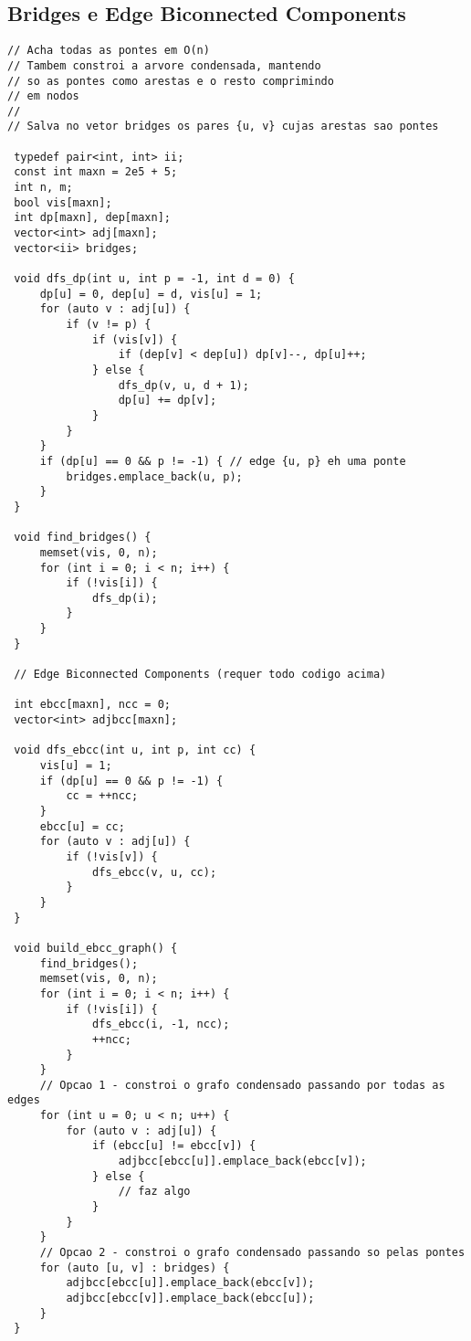 \documentclass[11pt, a4paper, twoside]{article}
\begin{document}
\subsection{Bridges e Edge Biconnected Components}
\begin{lstlisting}
// Acha todas as pontes em O(n)
// Tambem constroi a arvore condensada, mantendo
// so as pontes como arestas e o resto comprimindo
// em nodos
//
// Salva no vetor bridges os pares {u, v} cujas arestas sao pontes

 typedef pair<int, int> ii;
 const int maxn = 2e5 + 5;
 int n, m;
 bool vis[maxn];
 int dp[maxn], dep[maxn];
 vector<int> adj[maxn];
 vector<ii> bridges;
 
 void dfs_dp(int u, int p = -1, int d = 0) {
     dp[u] = 0, dep[u] = d, vis[u] = 1;
     for (auto v : adj[u]) {
         if (v != p) {
             if (vis[v]) {
                 if (dep[v] < dep[u]) dp[v]--, dp[u]++;
             } else {
                 dfs_dp(v, u, d + 1);
                 dp[u] += dp[v];
             }
         }
     }
     if (dp[u] == 0 && p != -1) { // edge {u, p} eh uma ponte
         bridges.emplace_back(u, p);
     }
 }
 
 void find_bridges() {
     memset(vis, 0, n);
     for (int i = 0; i < n; i++) {
         if (!vis[i]) {
             dfs_dp(i);
         }
     }
 }
 
 // Edge Biconnected Components (requer todo codigo acima)
 
 int ebcc[maxn], ncc = 0;
 vector<int> adjbcc[maxn];
 
 void dfs_ebcc(int u, int p, int cc) {
     vis[u] = 1;
     if (dp[u] == 0 && p != -1) {
         cc = ++ncc;
     }
     ebcc[u] = cc;
     for (auto v : adj[u]) {
         if (!vis[v]) {
             dfs_ebcc(v, u, cc);
         }
     }
 }
 
 void build_ebcc_graph() {
     find_bridges();
     memset(vis, 0, n);
     for (int i = 0; i < n; i++) {
         if (!vis[i]) {
             dfs_ebcc(i, -1, ncc);
             ++ncc;
         }
     }
     // Opcao 1 - constroi o grafo condensado passando por todas as edges
     for (int u = 0; u < n; u++) {
         for (auto v : adj[u]) {
             if (ebcc[u] != ebcc[v]) {
                 adjbcc[ebcc[u]].emplace_back(ebcc[v]);
             } else {
                 // faz algo
             }
         }
     }
     // Opcao 2 - constroi o grafo condensado passando so pelas pontes
     for (auto [u, v] : bridges) {
         adjbcc[ebcc[u]].emplace_back(ebcc[v]);
         adjbcc[ebcc[v]].emplace_back(ebcc[u]);
     }
 }
\end{lstlisting}
\end{document}
